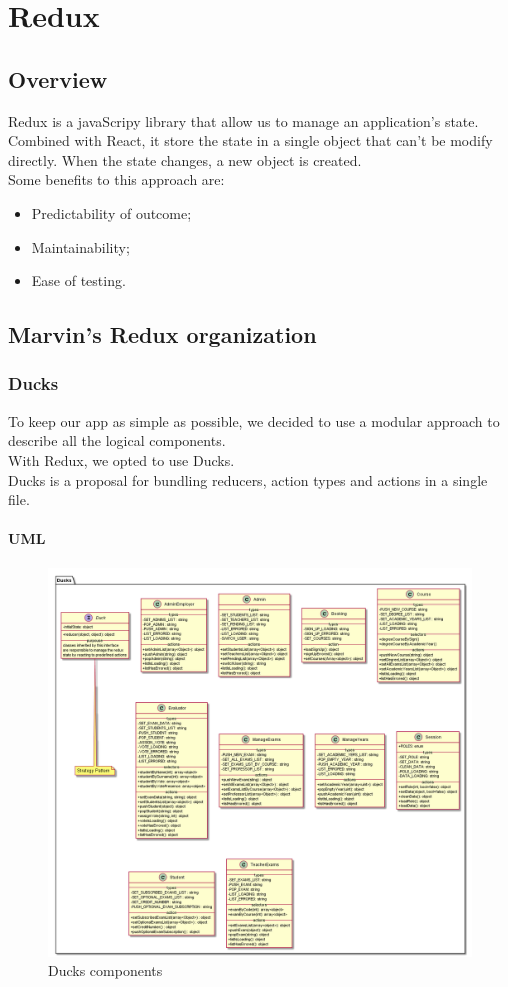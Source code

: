 \documentclass[ManualeSviluppatore.tex]{subfiles}
\begin{document}
\chapter{Redux}
\section{Overview}
Redux is a javaScripy library that allow us to manage an application's state. \\ 
Combined with React, it store the state in a single object that can't be modify directly. When the state changes, a new object is created. \\
Some benefits to this approach are:
\begin{itemize}
	\item Predictability of outcome;
	\item Maintainability;
	\item Ease of testing.
\end{itemize}

\section{Marvin's Redux organization} %
	\subsection{Ducks}
	To keep our app as simple as possible, we decided to use a modular approach to describe all the logical components.\\
	With Redux, we opted to use Ducks.\\
	Ducks is a proposal for bundling reducers, action types and actions in a single file.
		\subsubsection{UML}
			\begin{figure}[h]
			\centering
			\includegraphics[width=1\linewidth]{"diagrammi/ducks"}
			\caption{Ducks components}
			\label{fig:Ducks components}
		\end{figure}
\end{document}
